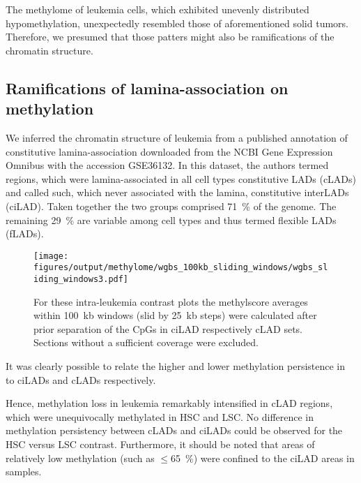The methylome of \dnmtchip \kitpos leukemia cells, which exhibited unevenly distributed hypomethylation, unexpectedly resembled those of aforementioned solid tumors. Therefore, we presumed that those patters might also be ramifications of the chromatin structure.

\subsection{Ramifications of lamina-association on methylation}

We inferred the chromatin structure of \dnmtchip \kitpos leukemia from a published annotation of constitutive lamina-association downloaded from the NCBI Gene Expression Omnibus with the accession GSE36132\cite{Meuleman2013}. In this dataset, the authors termed regions, which were lamina-associated\cite{Peric-Hupkes2010} in all cell types constitutive LADs (cLADs) and called such, which never associated with the lamina, constitutive interLADs (ciLAD). Taken together the two groups comprised \SI{71}{\percent} of the genome. The remaining \SI{29}{\percent} are variable among cell types and thus termed flexible LADs (fLADs). 

\begin{figure}[!ht] 
	\centering
	\texttt{[image: figures/output/methylome/wgbs\_100kb\_sliding\_windows/wgbs\_sliding\_windows3.pdf]} 
	\caption[Scatterplot of pairwise leukemia contrasts for ciLAD/cLAD CpG averages]{For these intra-leukemia contrast plots the methylscore averages within \SI{100}{\kilo b} windows (slid by \SI{25}{\kilo b} steps) were calculated after prior separation of the CpGs in ciLAD respectively cLAD sets. Sections without a sufficient coverage were excluded.}
	\label{fig:wgbs_sliding_windows2}
\end{figure}

It was clearly possible to relate the higher and lower methylation persistence in \dnmtchip to ciLADs and cLADs respectively.  

Hence, methylation loss in \dnmtchip \kitpos leukemia remarkably intensified in cLAD regions, which were unequivocally methylated in \dnmtwt HSC and LSC. No difference in methylation persistency between cLADs and ciLADs could be observed for the \dnmtwt HSC versus LSC contrast. Furthermore, it should be noted that areas of relatively low methylation (such as $\leq $\SI{65}{\percent}) were confined to the ciLAD areas in \dnmtwt samples. 

